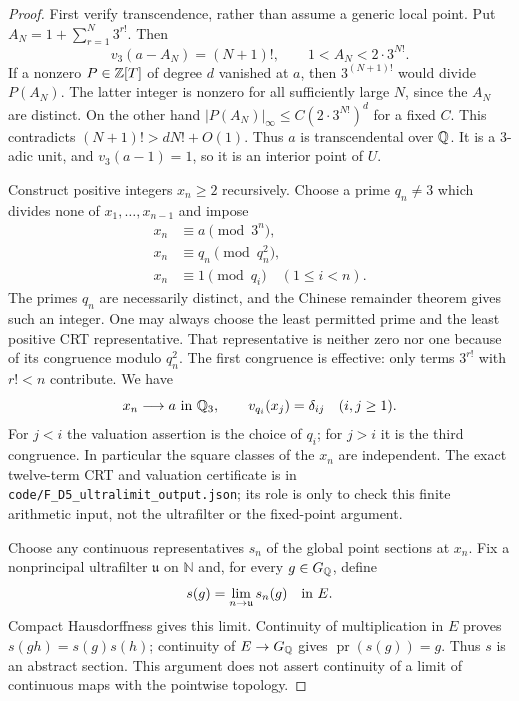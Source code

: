 \begin{proof}
First verify transcendence, rather than assume a generic local
point. Put $A_N=1+\sum_{r=1}^N3^{r!}$. Then
\[
 v_3(a-A_N)=(N+1)!,\qquad
                   1<A_N<2\cdot3^{N!}.
\]
If a nonzero $P\in\mathbb Z[T]$ of degree $d$ vanished at $a$,
then $3^{(N+1)!}$ would divide $P(A_N)$. The latter integer
is nonzero for all sufficiently large $N$, since the $A_N$
are distinct. On the other hand
$|P(A_N)|_\infty\leq C(2\cdot3^{N!})^d$ for a fixed
$C$. This contradicts $(N+1)!>dN!+O(1)$. Thus $a$ is
transcendental over $\mathbb Q$. It is a $3$-adic unit, and
$v_3(a-1)=1$, so it is an interior point of $U$.

Construct positive integers $x_n\geq2$ recursively. Choose a
prime $q_n\ne3$ which divides none of $x_1,\ldots,x_{n-1}$
and impose
\[
 \begin{split}
 x_n&\equiv a\pmod{3^n},\\
 x_n&\equiv q_n\pmod{q_n^2},\\
 x_n&\equiv1\pmod{q_i}\quad(1\leq i<n).
 \end{split}
\]
The primes $q_n$ are necessarily distinct, and the Chinese
remainder theorem gives such an integer. One may always choose
the least permitted prime and the least positive CRT representative.
That representative is neither zero nor one because of its
congruence modulo $q_n^2$. The first congruence is effective:
only terms $3^{r!}$ with $r!<n$ contribute. We have
\[
           x_n\longrightarrow a\text{ in }\mathbb Q_3,
          \qquad v_{q_i}(x_j)=\delta_{ij}\quad(i,j\geq1).
\]
For $j<i$ the valuation assertion is the choice of $q_i$;
for $j>i$ it is the third congruence. In particular the
square classes of the $x_n$ are independent. The exact
twelve-term CRT and valuation certificate is in
\texttt{code/F\_D5\_ultralimit\_output.json}; its role is
only to check this finite arithmetic input, not the
ultrafilter or the fixed-point argument.

Choose any continuous representatives $s_n$ of the global
point sections at $x_n$. Fix a nonprincipal ultrafilter
$\mathfrak u$ on $\mathbb N$ and, for every $g\in G_\mathbb Q$,
define
\[
                         s(g)=\lim_{n\to\mathfrak u}s_n(g)
                              \quad\hbox{in }E.
\]
Compact Hausdorffness gives this limit. Continuity of
multiplication in $E$ proves
$s(gh)=s(g)s(h)$; continuity of $E\to G_\mathbb Q$ gives
$\operatorname{pr}(s(g))=g$. Thus $s$ is an abstract section.
This argument does not assert continuity of a limit of
continuous maps with the pointwise topology.


\end{proof}

